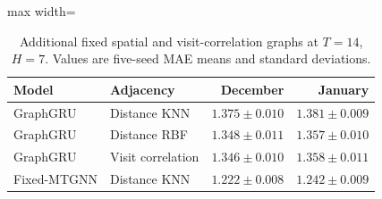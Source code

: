 \begin{table}[!htbp]
\centering
\begingroup
\singlespacing
\fontsize{9pt}{10.5pt}\selectfont
\setlength{\tabcolsep}{4pt}
\renewcommand{\arraystretch}{1.08}
\caption{Additional fixed spatial and visit-correlation graphs at $T=14$, $H=7$. Values are five-seed MAE means and standard deviations.}
\label{tab:spatial_graphs}
\begin{adjustbox}{max width=\linewidth}
\begin{tabular}{llrr}
\toprule
Model & Adjacency & December & January \\
\midrule
GraphGRU & Distance KNN & $1.375\pm 0.010$ & $1.381\pm 0.009$ \\
GraphGRU & Distance RBF & $1.348\pm 0.011$ & $1.357\pm 0.010$ \\
GraphGRU & Visit correlation & $1.346\pm 0.010$ & $1.358\pm 0.011$ \\
Fixed-MTGNN & Distance KNN & $1.222\pm 0.008$ & $1.242\pm 0.009$ \\
\bottomrule
\end{tabular}
\end{adjustbox}
\endgroup
\end{table}
